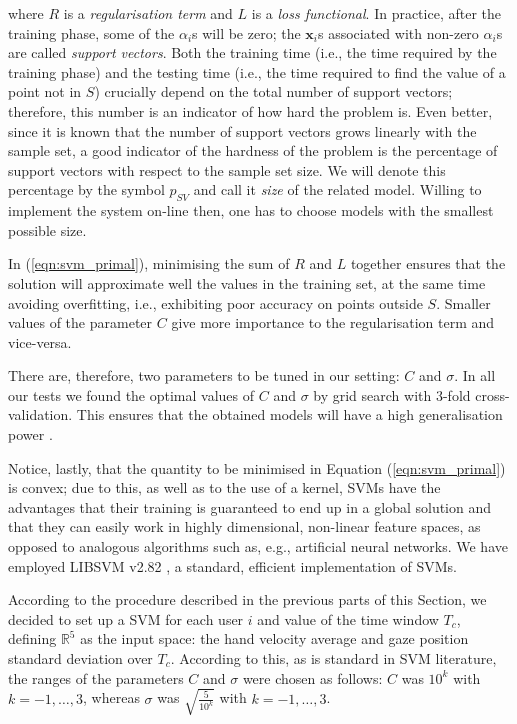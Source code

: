 \documentclass[a4paper,10pt,conference]{ieeeconf}
\def\RR{\mathbb{R}}
\def\xx{\mathbf{x}}
\begin{document}
\noindent where $R$ is a \emph{regularisation term} and $L$ is a
\emph{loss functional}. In practice, after the training phase, some of
the $\alpha_i$s will be zero; the $\xx_i$s associated with non-zero
$\alpha_i$s are called \emph{support vectors}. Both the training time
(i.e., the time required by the training phase) and the testing time
(i.e., the time required to find the value of a point not in $S$)
crucially depend on the total number of support vectors; therefore,
this number is an indicator of how hard the problem is. Even better,
since it is known \cite{Steinwart03} that the number of support
vectors grows linearly with the sample set, a good indicator of the
hardness of the problem is the percentage of support vectors with
respect to the sample set size. We will denote this percentage by the
symbol $p_{SV}$ and call it \emph{size} of the related model. Willing
to implement the system on-line then, one has to choose models with
the smallest possible size.

In (\ref{eqn:svm_primal}), minimising the sum of $R$ and $L$ together
ensures that the solution will approximate well the values in the
training set, at the same time avoiding overfitting, i.e., exhibiting
poor accuracy on points outside $S$. Smaller values of the parameter
$C$ give more importance to the regularisation term and vice-versa.

There are, therefore, two parameters to be tuned in our setting: $C$
and $\sigma$. In all our tests we found the optimal values of $C$ and
$\sigma$ by grid search with $3$-fold cross-validation. This ensures
that the obtained models will have a high generalisation
power \cite{...}.

Notice, lastly, that the quantity to be minimised in Equation
(\ref{eqn:svm_primal}) is convex; due to this, as well as to the use
of a kernel, SVMs have the advantages that their training is
guaranteed to end up in a global solution and that they can easily
work in highly dimensional, non-linear feature spaces, as opposed to
analogous algorithms such as, e.g., artificial neural networks. We
have employed LIBSVM v2.82 \cite{ChangL01}, a standard, efficient
implementation of SVMs.

According to the procedure described in the previous parts of this
Section, we decided to set up a SVM for each user $i$ and value of the
time window $T_c$, defining $\RR^{5}$ as the input space: the hand
velocity average and gaze position standard deviation over
$T_c$. According to this, as is standard in SVM literature, the ranges
of the parameters $C$ and $\sigma$ were chosen as follows: $C$ was
$10^k$ with $k=-1,\ldots,3$, whereas $\sigma$ was
$\sqrt{\frac{5}{10^{k}}}$ with $k=-1,\ldots,3$.
\end{document}
